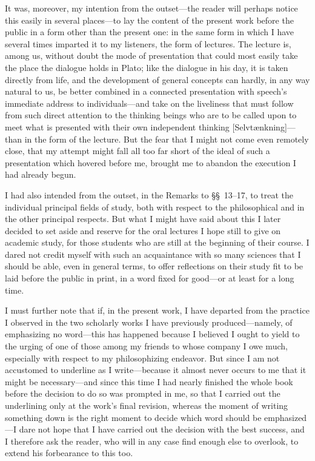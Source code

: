 \documentclass[12pt,a4paper]{book}
\begin{document}
It was, moreover, my intention from the outset---the reader will perhaps notice
this easily in several places---to lay the content of the present work before
the public in a form other than the present one: in the same form in which I
have several times imparted it to my listeners, the form of lectures. The
lecture is, among us, without doubt the mode of presentation that could most
easily take the place the dialogue holds in Plato; like the dialogue in his
day, it is taken directly from life, and the development of general concepts can
hardly, in any way natural to us, be better combined in a connected
presentation with speech's immediate address to individuals---and take on the
liveliness that must follow from such direct attention to the thinking beings
who are to be called upon to meet what is presented with their own independent
thinking [Selvtænkning]---than in the form of the lecture. But the fear that I
might not come even remotely close, that my attempt might fall all too far short
of the ideal of such a presentation which hovered before me, brought me to
abandon the execution I had already begun.

I had also intended from the outset, in the Remarks to \S\S~13--17, to treat
the individual principal fields of study, both with respect to the philosophical
and in the other principal respects. But what I might have said about this I
later decided to set aside and reserve for the oral lectures I hope still to
give on academic study, for those students who are still at the beginning of
their course. I dared not credit myself with such an acquaintance with so many
sciences that I should be able, even in general terms, to offer reflections on
their study fit to be laid before the public in print, in a word fixed for
good---or at least for a long time.

I must further note that if, in the present work, I have departed from the
practice I observed in the two scholarly works I have previously
produced---namely, of emphasizing no word---this has happened because I believed
I ought to yield to the urging of one of those among my friends to whose company
I owe much, especially with respect to my philosophizing endeavor. But since I
am not accustomed to underline as I write---because it almost never occurs to me
that it might be necessary---and since this time I had nearly finished the whole
book before the decision to do so was prompted in me, so that I carried out the
underlining only at the work's final revision, whereas the moment of writing
something down is the right moment to decide which word should be
emphasized---I dare not hope that I have carried out the decision with the best
success, and I therefore ask the reader, who will in any case find enough else
to overlook, to extend his forbearance to this too.
\end{document}
